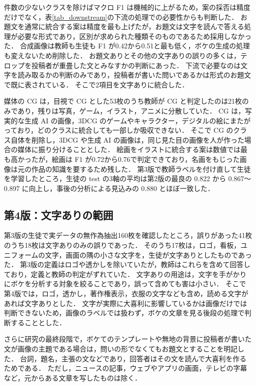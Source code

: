 件数の少ないクラスを除けばマクロ F1 は機械的に上がるため，案の採否は精度だけでなく，表\ref{tab_downstream}の下流の処理での必要性からも判断した．
お題文を通常に統合する案は精度を最も上げたが，お題文は文字を読んで答える処理が必要な形式であり，区別が求められた種類そのものであるため採用しなかった．
合成画像は教師も生徒も F1 が0.42から0.51と最も低く，ボケの生成の処理も変えないため削除した．
お題文ありとその他の文字ありの誤りの多くは，テロップを投稿者が重畳した文とみなすかの判断にあった．
下流で必要なのは文字を読み取るかの判断のみであり，投稿者が書いた問いであるかは形式のお題文で既に表されている．
そこで2項目を文字ありに統合した．

媒体の CG は，目視で CG とした53枚のうち教師が CG と判定したのは21枚のみであり，残りは写真，ゲーム，イラスト，アニメに分散していた．
CG は，写実的な生成 AI の画像，3DCG のゲームやキャラクター，デジタルの絵にまたがっており，どのクラスに統合しても一部しか吸収できない．
そこで CG のクラス自体を削除し，3DCG や生成 AI の画像は，同じ見た目の画像を人が作った場合の媒体に振り分けることとした．
絵画をイラストに統合する案は数値では最も高かったが，絵画は F1 が0.72から0.76で判定できており，名画をもじった画像は元の作品の知識を要するため残した．
第3版で教師ラベルを付け直して生徒を学習したところ，生徒の test の3軸の平均は第2版の最良の 0.822 から 0.867〜0.897 に向上し，事後の分析による見込みの 0.880 とほぼ一致した．

\subsection{第4版：文字ありの範囲}
第3版の生徒で実データの無作為抽出160枚を確認したところ，誤りがあった41枚のうち18枚は文字ありのみの誤りであった．
そのうち17枚は，ロゴ，看板，ユニフォームの文字，画面の隅の小さな文字を，生徒が文字ありとしたものであった．
第3版の定義はロゴや透かしを除いていたが，教師はこれらを含めて回答しており，定義と教師の判定がずれていた．
文字ありの用途は，文字を手がかりにボケを分析する対象を絞ることであり，誤って含めても害は小さい．
そこで第4版では，ロゴ，透かし，著作権表示，衣服の文字なども含め，読める文字があれば文字ありとした．
文字が実際に大喜利に影響しているかは画像だけでは判断できないため，画像のラベルでは扱わず，ボケの文章を見る後段の処理で判断することとした．

さらに研究の最終段階で，ボケてのテンプレートや無地の背景に投稿者が書いた文が画像の主題である場合は，問いの形でなくてもお題文とすることを明記した．
台詞，題名，主張の文などであり，回答者はその文を読んで大喜利を作るためである．
ただし，ニュースの記事，ウェブやアプリの画面，テレビの字幕など，元からある文章を写したものは除く．

